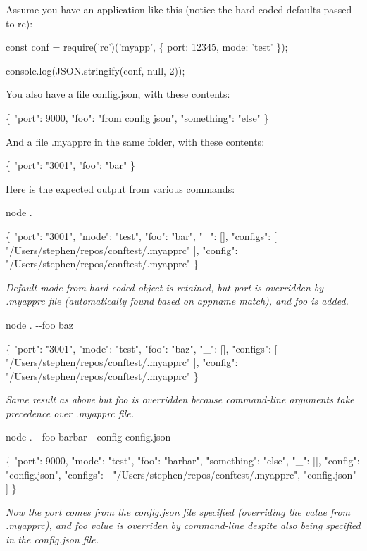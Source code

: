 Assume you have an application like this (notice the hard-\/coded defaults passed to rc)\+: 
\begin{DoxyCode}
const conf = require('rc')('myapp', \{
    port: 12345,
    mode: 'test'
\});

console.log(JSON.stringify(conf, null, 2));
\end{DoxyCode}
 You also have a file {\ttfamily config.\+json}, with these contents\+: 
\begin{DoxyCode}
\{
  "port": 9000,
  "foo": "from config json",
  "something": "else"
\}
\end{DoxyCode}
 And a file {\ttfamily .myapprc} in the same folder, with these contents\+: 
\begin{DoxyCode}
\{
  "port": "3001",
  "foo": "bar"
\}
\end{DoxyCode}
 Here is the expected output from various commands\+:

{\ttfamily node .} 
\begin{DoxyCode}
\{
  "port": "3001",
  "mode": "test",
  "foo": "bar",
  "\_": [],
  "configs": [
    "/Users/stephen/repos/conftest/.myapprc"
  ],
  "config": "/Users/stephen/repos/conftest/.myapprc"
\}
\end{DoxyCode}
 {\itshape Default {\ttfamily mode} from hard-\/coded object is retained, but port is overridden by {\ttfamily .myapprc} file (automatically found based on appname match), and {\ttfamily foo} is added.}

{\ttfamily node . -\/-\/foo baz} 
\begin{DoxyCode}
\{
  "port": "3001",
  "mode": "test",
  "foo": "baz",
  "\_": [],
  "configs": [
    "/Users/stephen/repos/conftest/.myapprc"
  ],
  "config": "/Users/stephen/repos/conftest/.myapprc"
\}
\end{DoxyCode}
 {\itshape Same result as above but {\ttfamily foo} is overridden because command-\/line arguments take precedence over {\ttfamily .myapprc} file.}

{\ttfamily node . -\/-\/foo barbar -\/-\/config config.\+json} 
\begin{DoxyCode}
\{
  "port": 9000,
  "mode": "test",
  "foo": "barbar",
  "something": "else",
  "\_": [],
  "config": "config.json",
  "configs": [
    "/Users/stephen/repos/conftest/.myapprc",
    "config.json"
  ]
\}
\end{DoxyCode}
 {\itshape Now the {\ttfamily port} comes from the {\ttfamily config.\+json} file specified (overriding the value from {\ttfamily .myapprc}), and {\ttfamily foo} value is overriden by command-\/line despite also being specified in the {\ttfamily config.\+json} file.}

